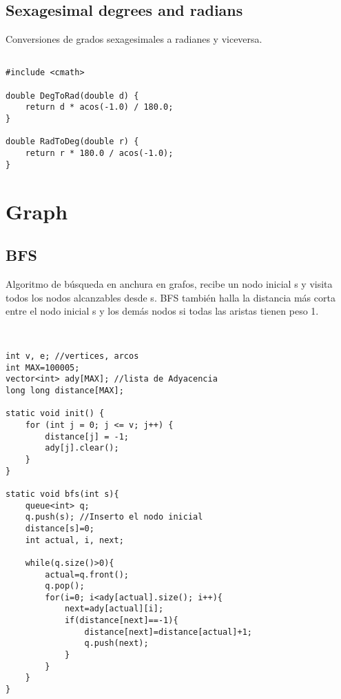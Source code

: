 \documentclass[11pt,letterpaper,twocolumn,twosided]{article}
\begin{document}
\subsection{Sexagesimal degrees and radians}
Conversiones de grados sexagesimales a radianes y viceversa.
\begin{lstlisting}

#include <cmath>

double DegToRad(double d) { 
	return d * acos(-1.0) / 180.0; 
}

double RadToDeg(double r) { 
	return r * 180.0 / acos(-1.0); 
}
\end{lstlisting}

\section{Graph}

\subsection{BFS}
Algoritmo de b\'usqueda en anchura en grafos, recibe un nodo inicial s y visita todos los nodos alcanzables desde s. BFS tambi\'en halla la distancia m\'as corta entre el nodo inicial s y los dem\'as nodos si todas las aristas tienen peso 1.
\begin{lstlisting}


int v, e; //vertices, arcos
int MAX=100005; 
vector<int> ady[MAX]; //lista de Adyacencia
long long distance[MAX];

static void init() {
    for (int j = 0; j <= v; j++) {
        distance[j] = -1;
        ady[j].clear();
    }
}

static void bfs(int s){
    queue<int> q;
    q.push(s); //Inserto el nodo inicial
    distance[s]=0;
    int actual, i, next;
        
    while(q.size()>0){
        actual=q.front();
        q.pop();
        for(i=0; i<ady[actual].size(); i++){
            next=ady[actual][i];
            if(distance[next]==-1){
                distance[next]=distance[actual]+1;
                q.push(next);
            }
        }
    }
}
\end{lstlisting}
\end{document}
